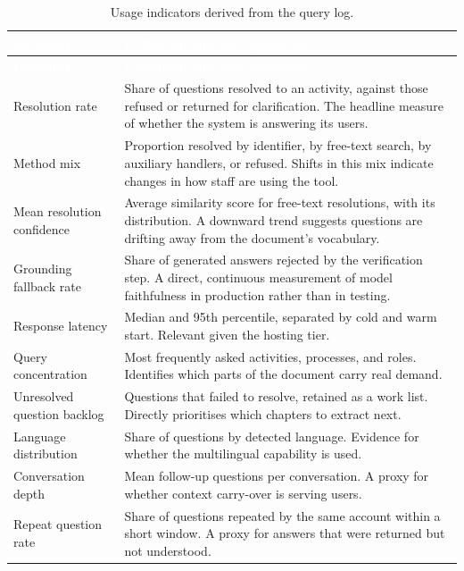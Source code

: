 \begin{longtable}{|p{}|p{}|}
\caption{Usage indicators derived from the query log.}\label{tab:usagekpi}\\
\hline
\rowcolor{thesisgreen}\textcolor{white}{\textbf{Indicator}} & \textcolor{white}{\textbf{Definition and interpretation}} \\
\hline
\endfirsthead
\hline
\rowcolor{thesisgreen}\textcolor{white}{\textbf{Indicator}} & \textcolor{white}{\textbf{Definition and interpretation}} \\
\hline
\endhead
Resolution rate & Share of questions resolved to an activity, against those refused or returned for clarification. The headline measure of whether the system is answering its users. \\ \hline
Method mix & Proportion resolved by identifier, by free-text search, by auxiliary handlers, or refused. Shifts in this mix indicate changes in how staff are using the tool. \\ \hline
Mean resolution confidence & Average similarity score for free-text resolutions, with its distribution. A downward trend suggests questions are drifting away from the document's vocabulary. \\ \hline
Grounding fallback rate & Share of generated answers rejected by the verification step. A direct, continuous measurement of model faithfulness in production rather than in testing. \\ \hline
Response latency & Median and 95th percentile, separated by cold and warm start. Relevant given the hosting tier. \\ \hline
Query concentration & Most frequently asked activities, processes, and roles. Identifies which parts of the document carry real demand. \\ \hline
Unresolved question backlog & Questions that failed to resolve, retained as a work list. Directly prioritises which chapters to extract next. \\ \hline
Language distribution & Share of questions by detected language. Evidence for whether the multilingual capability is used. \\ \hline
Conversation depth & Mean follow-up questions per conversation. A proxy for whether context carry-over is serving users. \\ \hline
Repeat question rate & Share of questions repeated by the same account within a short window. A proxy for answers that were returned but not understood. \\ \hline
\end{longtable}

